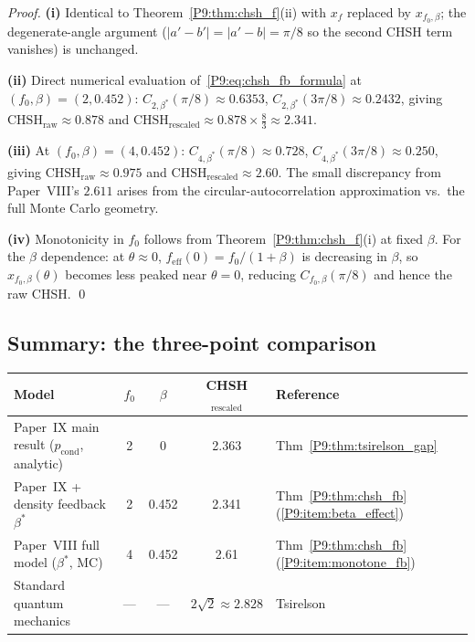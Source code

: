 \documentclass[11pt,a4paper]{article}
\theoremstyle{definition}
\theoremstyle{remark}
\newcommand{\bst}{\beta^{*}}
\newcommand{\pcond}{p_{\mathrm{cond}}}
\newcommand{\CHSH}{\mathrm{CHSH}}
\begin{document}
\begin{proof}
\textbf{(i)} Identical to Theorem~\ref{P9:thm:chsh_f}(ii) with
$x_f$ replaced by $x_{f_0,\beta}$; the degenerate-angle argument
($|a'-b'|=|a'-b|=\pi/8$ so the second CHSH term vanishes) is unchanged.
 
\textbf{(ii)} Direct numerical evaluation of~\eqref{P9:eq:chsh_fb_formula}
at $(f_0,\beta)=(2,0.452)$:
$C_{2,\bst}(\pi/8)\approx0.6353$, $C_{2,\bst}(3\pi/8)\approx0.2432$,
giving $\CHSH_\mathrm{raw}\approx0.878$ and
$\CHSH_\mathrm{rescaled}\approx0.878\times\tfrac{8}{3}\approx2.341$.
 
\textbf{(iii)} At $(f_0,\beta)=(4,0.452)$:
$C_{4,\bst}(\pi/8)\approx0.728$, $C_{4,\bst}(3\pi/8)\approx0.250$,
giving $\CHSH_\mathrm{raw}\approx0.975$ and
$\CHSH_\mathrm{rescaled}\approx2.60$.
The small discrepancy from Paper~VIII's $2.611$ arises from the
circular-autocorrelation approximation vs.\ the full Monte Carlo geometry.
 
\textbf{(iv)} Monotonicity in $f_0$ follows from Theorem~\ref{P9:thm:chsh_f}(i)
at fixed $\beta$.
For the $\beta$ dependence: at $\theta\approx0$,
$f_\mathrm{eff}(0)=f_0/(1+\beta)$ is decreasing in $\beta$,
so $x_{f_0,\beta}(\theta)$ becomes less peaked near $\theta=0$,
reducing $C_{f_0,\beta}(\pi/8)$ and hence the raw CHSH.
\qed
\end{proof}
 
\subsection{Summary: the three-point comparison}
 
\begin{center}
\begin{tabular}{lcccl}
\toprule
Model & $f_0$ & $\beta$ & CHSH$_\mathrm{rescaled}$ & Reference \\
\midrule
Paper~IX main result ($\pcond$, analytic) & 2 & 0 & 2.363 & Thm~\ref{P9:thm:tsirelson_gap} \\
Paper~IX + density feedback $\bst$        & 2 & 0.452 & 2.341 & Thm~\ref{P9:thm:chsh_fb}(\ref{P9:item:beta_effect}) \\
Paper~VIII full model ($\beta^*$, MC)      & 4 & 0.452 & 2.61  & Thm~\ref{P9:thm:chsh_fb}(\ref{P9:item:monotone_fb}) \\
Standard quantum mechanics                & — & — & $2\sqrt{2}\approx2.828$ & Tsirelson~\cite{Tsirelson1980} \\
\bottomrule
\end{tabular}
\end{center}
 
\end{document}
